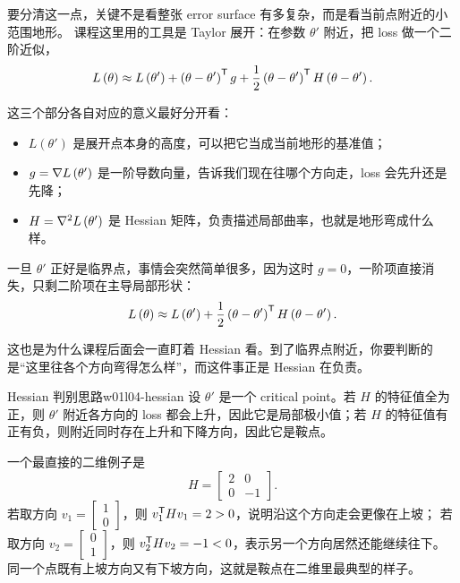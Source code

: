 \documentclass[main.tex]{subfiles}
\begin{document}
要分清这一点，关键不是看整张 error surface 有多复杂，而是看当前点附近的小范围地形。
课程这里用的工具是 Taylor 展开：在参数 $\theta'$ 附近，把 loss 做一个二阶近似，
\begin{equation}
  L\left( \theta \right)
  \approx
  L\left( \theta' \right)
  +
  \left( \theta-\theta' \right)^{\mathsf{T}} g
  +
  \frac{1}{2}\left( \theta-\theta' \right)^{\mathsf{T}} H \left( \theta-\theta' \right).
  \label{eq:w01l04-taylor}
\end{equation}

这三个部分各自对应的意义最好分开看：
\begin{itemize}
  \item $L(\theta')$ 是展开点本身的高度，可以把它当成当前地形的基准值；
  \item $g=\nabla L\left( \theta' \right)$ 是一阶导数向量，告诉我们现在往哪个方向走，loss 会先升还是先降；
  \item $H=\nabla^2 L\left( \theta' \right)$ 是 Hessian 矩阵，负责描述局部曲率，也就是地形弯成什么样。
\end{itemize}

一旦 $\theta'$ 正好是临界点，事情会突然简单很多，因为这时 $g=0$，一阶项直接消失，只剩二阶项在主导局部形状：
\begin{equation}
  L\left( \theta \right)
  \approx
  L\left( \theta' \right)
  +
  \frac{1}{2}\left( \theta-\theta' \right)^{\mathsf{T}} H \left( \theta-\theta' \right).
  \label{eq:w01l04-critical-taylor}
\end{equation}

这也是为什么课程后面会一直盯着 Hessian 看。到了临界点附近，你要判断的是“这里往各个方向弯得怎么样”，而这件事正是 Hessian 在负责。

\begin{theorem}{Hessian 判别思路}{w01l04-hessian}
设 $\theta'$ 是一个 critical point。若 $H$ 的特征值全为正，则 $\theta'$ 附近各方向的 loss 都会上升，因此它是局部极小值；若 $H$ 的特征值有正有负，则附近同时存在上升和下降方向，因此它是鞍点。
\end{theorem}

\begin{examplebox}
一个最直接的二维例子是
\[
  H = \begin{bmatrix}
    2 & 0 \\
    0 & -1
  \end{bmatrix}.
\]
若取方向 $v_1=\begin{bmatrix}1\\0\end{bmatrix}$，则 $v_1^{\mathsf{T}} H v_1 = 2 > 0$，说明沿这个方向走会更像在上坡；
若取方向 $v_2=\begin{bmatrix}0\\1\end{bmatrix}$，则 $v_2^{\mathsf{T}} H v_2 = -1 < 0$，表示另一个方向居然还能继续往下。
同一个点既有上坡方向又有下坡方向，这就是鞍点在二维里最典型的样子。
\end{examplebox}
\end{document}

